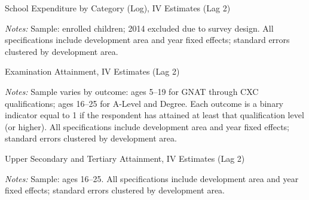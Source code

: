 \documentclass[12pt]{article}
\newcommand*{\TableLagTwoPath}{../Paper_3_Tables/Lagged_2Year_Tables}
\begin{document}
	\begin{table}[H]
	\centering
	\begin{adjustbox}{max width=\linewidth, center}
	\begin{threeparttable}
		\caption{School Expenditure by Category (Log), IV Estimates (Lag 2)}
		\label{tab:expenditures_log_lag2}
		{\small}
		\begin{tablenotes}
			\small
			\item \textit{Notes:} Sample: enrolled children; 2014 excluded due to survey design. All specifications include development area and year fixed effects; standard errors clustered by development area.
		\end{tablenotes}
	\end{threeparttable}
	\end{adjustbox}
	\end{table}
	\begin{table}[H]
	\centering
	\begin{adjustbox}{max width=\linewidth, center}
	\begin{threeparttable}
		\caption{Examination Attainment, IV Estimates (Lag 2)}
		\label{tab:exams_lag2}
		{\small}
		\begin{tablenotes}
			\small
			\item \textit{Notes:} Sample varies by outcome: ages 5--19 for GNAT through CXC qualifications; ages 16--25 for A-Level and Degree. Each outcome is a binary indicator equal to 1 if the respondent has attained at least that qualification level (or higher). All specifications include development area and year fixed effects; standard errors clustered by development area.
		\end{tablenotes}
	\end{threeparttable}
	\end{adjustbox}
	\end{table}
	\begin{table}[H]
	\centering
	\begin{adjustbox}{max width=\linewidth, center}
	\begin{threeparttable}
		\caption{Upper Secondary and Tertiary Attainment, IV Estimates (Lag 2)}
		\label{tab:sixthform_lag2}
		{\small}
		\begin{tablenotes}
			\small
			\item \textit{Notes:} Sample: ages 16--25. All specifications include development area and year fixed effects; standard errors clustered by development area.
		\end{tablenotes}
	\end{threeparttable}
	\end{adjustbox}
	\end{table}
\end{document}
